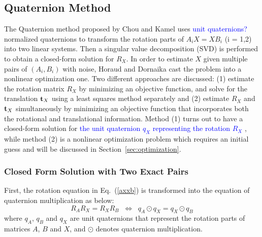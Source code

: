 \documentclass[twocolumn,10pt]{asme2ej}
\newcommand{\ttt}{{\bf t}}
\begin{document}
\subsection{Quaternion Method }
\label{sec:quats}
The Quaternion method proposed by Chou and Kamel \cite{chou1988quaternions,chou1991finding} uses \textcolor{blue}{unit quaternions?} normalized quaternions to transform the rotation parts of $A_{i}X = XB_{i}$ (i = 1,2) into two linear systems. Then a singular value decomposition (SVD) is performed to obtain a closed-form solution for $R_{X}$. In order to estimate $X$ given multiple pairs of $(A_{i}, B_{i})$ with noise, Horaud and Dornaika \cite{horaud1995hand} cast the problem into a nonlinear optimization one. Two different approaches are discussed: (1) estimate the rotation matrix $R_{X}$ by minimizing an objective function, and solve for the translation $\ttt_{X}$ using a least squares method separately and (2) estimate $R_{X}$ and $\ttt_{X}$ simultaneously by minimizing an objective function that incorporates both the rotational and translational information. Method (1) turns out to have a closed-form solution for \textcolor{blue}{the unit quaternion $q_{X}$ representing the rotation $R_{X}$}%
, while method (2) is a nonlinear optimization problem which requires an initial guess and will be discussed in Section~\ref{sec:optimization}. 
\subsubsection{Closed Form Solution with Two Exact Pairs}
\label{sec:quat_method}
First, the rotation equation in Eq.~(\ref{axxb}) is transformed into the equation of quaternion multiplication as below:
\begin{equation}
R_{A}R_{X} = R_{X}R_{B} 
\; \;
\Leftrightarrow
\; \;
q_{A}\odot q_{X} = q_{X}\odot q_{B}
\label{Quaternion}
\end{equation} 
where $q_{A}$, $q_{B}$ and $q_{X}$ are
unit quaternions that represent the rotation parts of matrices $A$, $B$ and $X$, and $\odot$ denotes quaternion multiplication.
\end{document}
